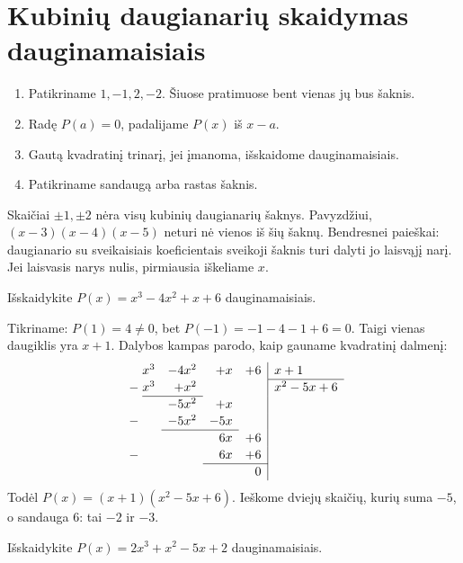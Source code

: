 \documentclass[11pt,a4paper]{scrartcl}
\begin{document}
\section{Kubinių daugianarių skaidymas dauginamaisiais}
\begin{algorithm}
\leavevmode\par
\begin{enumerate}[label=\arabic*.,leftmargin=*,nosep]
\item Patikriname \(1,-1,2,-2\). Šiuose pratimuose bent vienas jų bus šaknis.
\item Radę \(P(a)=0\), padalijame \(P(x)\) iš \(x-a\).
\item Gautą kvadratinį trinarį, jei įmanoma, išskaidome dauginamaisiais.
\item Patikriname sandaugą arba rastas šaknis.
\end{enumerate}
\end{algorithm}
\begin{remark*}
Skaičiai \(\pm1,\pm2\) nėra visų kubinių daugianarių šaknys. Pavyzdžiui, \((x-3)(x-4)(x-5)\) neturi nė vienos iš šių šaknų. Bendresnei paieškai: daugianario su sveikaisiais koeficientais sveikoji šaknis turi dalyti jo laisvąjį narį. Jei laisvasis narys nulis, pirmiausia iškeliame \(x\).
\end{remark*}
\newpage
\begin{example}[Šaknis \(-1\)]
Išskaidykite \(P(x)=x^3-4x^2+x+6\) dauginamaisiais.
\end{example}
\begin{solution}
Tikriname: \(P(1)=4\ne0\), bet \(P(-1)=-1-4-1+6=0\). Taigi vienas daugiklis yra \(x+1\).
Dalybos kampas parodo, kaip gauname kvadratinį dalmenį:
\[
\renewcommand{\arraystretch}{1.12}
\begin{array}{r@{\;}rrrr|l}
 &x^3&-4x^2&+x&+6&x+1\\\cline{6-6}
 -&x^3&+x^2&&&x^2-5x+6\\\cline{2-3}
 &&-5x^2&+x&&\\
 -&&-5x^2&-5x&&\\\cline{3-4}
 &&&6x&+6&\\
 -&&&6x&+6&\\\cline{4-5}
 &&&&0&
\end{array}
\]
Todėl \(P(x)=(x+1)(x^2-5x+6)\). Ieškome dviejų skaičių, kurių suma \(-5\), o sandauga \(6\): tai \(-2\) ir \(-3\).
\end{solution}
\begin{example}
Išskaidykite \(P(x)=2x^3+x^2-5x+2\) dauginamaisiais.
\end{example}
\end{document}
